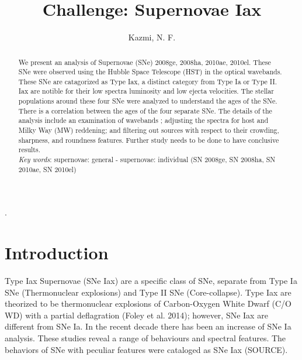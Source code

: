 \documentclass[preprint2]{aastex}
\begin{document}
\title{Challenge: Supernovae Iax }

\author{Kazmi, N. F.} 

\begin{abstract}
\noindent We present an analysis of Supernovae (SNe) 2008ge, 2008ha, 2010ae, 
2010el. These SNe were observed using the Hubble Space Telescope (HST) in the
optical wavebands.
These SNe are catagorized as Type Iax, a distinct category from Type Ia or Type II. 
Iax are notible for their low spectra luminosity and low ejecta velocities. 
The stellar populations around these four SNe were analyzed to understand
 the ages of the SNe. 
There is a correlation between the ages of the four separate SNe. 
The details of the analysis include an examination of wavebands ; 
adjusting the spectra for host and Milky Way (MW) reddening; 
and filtering out sources with respect to their crowding, sharpness, and
 roundness features.
 Further study needs to be done to have conclusive results. \\

\noindent\textit{Key words}: supernovae: general - supernovae: individual (SN 2008ge, SN 2008ha, 
SN 2010ae, SN 2010el)
\end{abstract}.

\section{Introduction}
Type Iax Supernovae (SNe Iax) are a specific class of SNe, separate from
Type Ia SNe (Thermonuclear explosions) and Type II SNe (Core-collapse). 
Type Iax are theorized to be thermonuclear explosions of Carbon-Oxygen
White Dwarf (C/O WD) with a partial deflagration (Foley et al. 2014); however,
SNe Iax are different from SNe Ia. 
In the recent decade there has been an increase of SNe Ia analysis. 
These studies reveal a range of behaviours and spectral features. 
The behaviors of SNe with peculiar features were cataloged as SNe Iax
(SOURCE).
\end{document}
